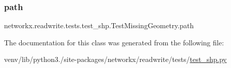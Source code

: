 \subsubsection{\texorpdfstring{path}{path}}
{\footnotesize\ttfamily networkx.\+readwrite.\+tests.\+test\+\_\+shp.\+Test\+Missing\+Geometry.\+path}



The documentation for this class was generated from the following file\+:\begin{DoxyCompactItemize}
\item 
venv/lib/python3./site-\/packages/networkx/readwrite/tests/\hyperlink{test__shp_8py}{test\+\_\+shp.\+py}\end{DoxyCompactItemize}
